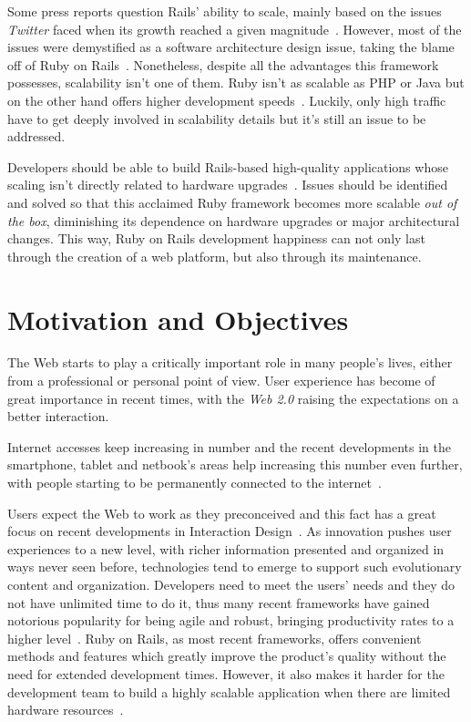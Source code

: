 Some press reports question Rails' ability to scale, mainly based on the issues \textit{Twitter} faced when its growth reached a given magnitude~\cite{interview_alex_payne}. However, most of the issues were demystified as a software architecture design issue, taking the blame off of Ruby on Rails~\cite{ror_ecosystem_whitepaper}. Nonetheless, despite all the advantages this framework possesses, scalability isn't one of them. Ruby isn't as scalable as PHP or Java but on the other hand offers higher development speeds~\cite{issues_web_frameworks}. Luckily, only high traffic have to get deeply involved in scalability details but it's still an issue to be addressed.

Developers should be able to build Rails-based high-quality applications whose scaling isn't directly related to hardware upgrades~\cite{interview_alex_payne}. Issues should be identified and solved so that this acclaimed Ruby framework becomes more scalable \textit{out of the box}, diminishing its dependence on hardware upgrades or major architectural changes. This way, Ruby on Rails development happiness can not only last through the creation of a web platform, but also through its maintenance.

\section{Motivation and Objectives} %
\label{sec:motivation_and_objectives}
The Web starts to play a critically important role in many people's lives, either from a professional or personal point of view. User experience has become of great importance in recent times, with the \textit{Web 2.0} raising the expectations on a better interaction.

Internet accesses keep increasing in number and the recent developments in the smartphone, tablet and netbook's areas help increasing this number even further, with people starting to be permanently connected to the internet~\cite{npd:3g,mobileweb,netbooks}.

Users expect the Web to work as they preconceived and this fact has a great focus on recent developments in Interaction Design~\cite{interaction_design}. As innovation pushes user experiences to a new level, with richer information presented and organized in ways never seen before, technologies tend to emerge to support such evolutionary content and organization. Developers need to meet the users' needs and they do not have unlimited time to do it, thus many recent frameworks have gained notorious popularity for being agile and robust, bringing productivity rates to a higher level~\cite{trends_webdev}. Ruby on Rails, as most recent frameworks, offers convenient methods and features which greatly improve the product's quality without the need for extended development times. However, it also makes it harder for the development team to build a highly scalable application when there are limited hardware resources~\cite{look_common_performance_problems_rails}.

